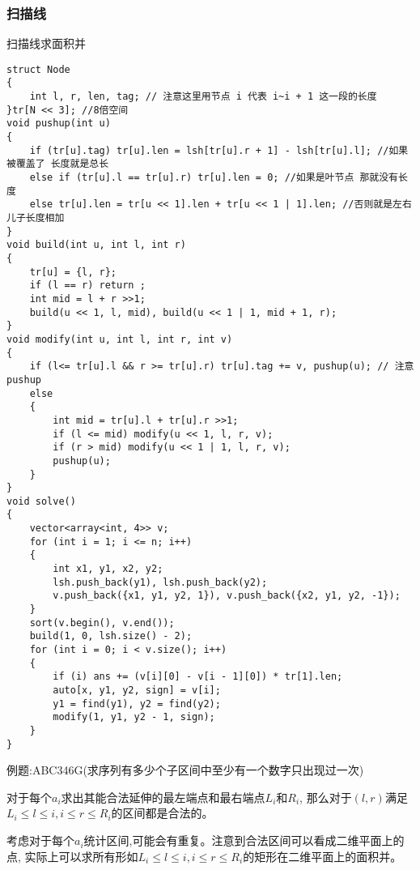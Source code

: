 \documentclass[a4paper, fontset=none]{ctexart}
\begin{document}
\subsubsection{扫描线}
扫描线求面积并
\begin{verbatim}
struct Node
{
    int l, r, len, tag; // 注意这里用节点 i 代表 i~i + 1 这一段的长度
}tr[N << 3]; //8倍空间
void pushup(int u)
{
    if (tr[u].tag) tr[u].len = lsh[tr[u].r + 1] - lsh[tr[u].l]; //如果被覆盖了 长度就是总长
    else if (tr[u].l == tr[u].r) tr[u].len = 0; //如果是叶节点 那就没有长度
    else tr[u].len = tr[u << 1].len + tr[u << 1 | 1].len; //否则就是左右儿子长度相加
}
void build(int u, int l, int r)
{
    tr[u] = {l, r};
    if (l == r) return ;
    int mid = l + r >>1;
    build(u << 1, l, mid), build(u << 1 | 1, mid + 1, r);
}
void modify(int u, int l, int r, int v)
{
    if (l<= tr[u].l && r >= tr[u].r) tr[u].tag += v, pushup(u); // 注意 pushup
    else
    {
        int mid = tr[u].l + tr[u].r >>1;
        if (l <= mid) modify(u << 1, l, r, v);
        if (r > mid) modify(u << 1 | 1, l, r, v);
        pushup(u);
    }
}
void solve()
{
    vector<array<int, 4>> v;
    for (int i = 1; i <= n; i++)
    {
        int x1, y1, x2, y2;
        lsh.push_back(y1), lsh.push_back(y2);
        v.push_back({x1, y1, y2, 1}), v.push_back({x2, y1, y2, -1});
    }
    sort(v.begin(), v.end());
    build(1, 0, lsh.size() - 2);
    for (int i = 0; i < v.size(); i++)
    {
        if (i) ans += (v[i][0] - v[i - 1][0]) * tr[1].len;
        auto[x, y1, y2, sign] = v[i];
        y1 = find(y1), y2 = find(y2);
        modify(1, y1, y2 - 1, sign);
    }
}
\end{verbatim}

例题:ABC346G(求序列有多少个子区间中至少有一个数字只出现过一次)

对于每个$a_i$求出其能合法延伸的最左端点和最右端点$L_i$和$R_i$,
那么对于$(l, r)$满足$L_i\leqslant l\leqslant i, i\leqslant r\leqslant R_i$的区间都是合法的。

考虑对于每个$a_i$统计区间,可能会有重复。注意到合法区间可以看成二维平面上的点,
实际上可以求所有形如$L_i\leqslant l\leqslant i, i\leqslant r\leqslant R_i$的矩形在二维平面上的面积并。
\end{document}
